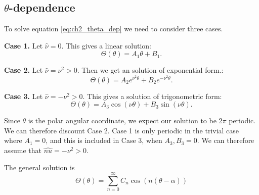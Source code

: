 \subsection{\texorpdfstring{$\theta$}{theta}-dependence}
To solve equation \eqref{eq:ch2_theta_dep} we need to consider three cases. \par
%
\textbf{Case 1.} Let $\hat{\nu} = 0$. This gives a linear solution:
    \begin{equation}
        \Theta(\theta) = A_1 \theta + B_1.
    \end{equation}\par
%
\textbf{Case 2.} Let $\hat{\nu} = \nu^2 > 0.$ Then we get an solution of exponential form.:
    \begin{equation}
        \Theta(\theta) = A_2 e^{\nu^2 \theta} + B_2 e^{- \nu^2 \theta}.
    \end{equation}\par
%
\textbf{Case 3.} Let $\hat{\nu}= - \nu^2 > 0$. This gives a solution of trigonometric form:
    \begin{equation}
        \Theta(\theta) = A_3 \cos(\nu\theta) + B_3 \sin(\nu\theta).
    \end{equation}\par
%
Since $\theta$ is the polar angular coordinate, we expect our solution to be $2\pi$ periodic. We can therefore discount Case 2. Case 1 is only periodic in the trivial case where $A_1 = 0$, and this is included in Case 3, when $A_3, B_3 = 0.$ We can therefore assume that $\hat{nu} = - \nu^2 > 0$.
%
\begin{propn} The general solution is
      \begin{equation}
          \Theta(\theta) = \sum^\infty_{n=0} C_n \cos(n (\theta - \alpha))
      \end{equation}
  \end{propn}
